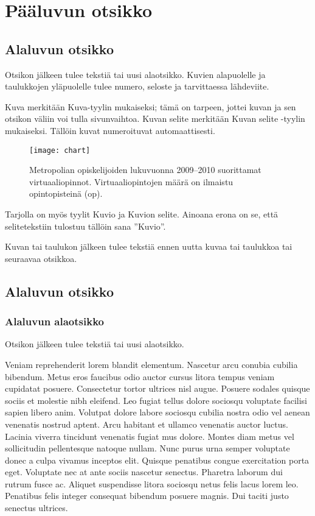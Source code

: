 \chapter{Pääluvun otsikko}

\section{Alaluvun otsikko}
Otsikon jälkeen tulee tekstiä tai uusi alaotsikko. Kuvien alapuolelle ja taulukkojen yläpuolelle tulee numero, seloste ja tarvittaessa lähdeviite.

Kuva merkitään Kuva-tyylin mukaiseksi; tämä on tarpeen, jottei kuvan ja sen otsikon väliin voi tulla sivunvaihtoa. Kuvan selite merkitään Kuvan selite -tyylin mukaiseksi. Tällöin kuvat numeroituvat automaattisesti.

\begin{figure}[h]
  \texttt{[image: chart]}
  \caption{Metropolian opiskelijoiden lukuvuonna 2009–2010 suorittamat virtuaaliopinnot. Virtuaaliopintojen määrä on ilmaistu opintopisteinä (op).}
\end{figure}

Tarjolla on myös tyylit Kuvio ja Kuvion selite. Ainoana erona on se, että selitetekstiin tulostuu tällöin sana ”Kuvio”.

Kuvan tai taulukon jälkeen tulee tekstiä ennen uutta kuvaa tai taulukkoa tai seuraavaa otsikkoa.

\section{Alaluvun otsikko}

\subsection{Alaluvun alaotsikko}

Otsikon jälkeen tulee tekstiä tai uusi alaotsikko.

Veniam reprehenderit lorem blandit elementum. Nascetur arcu conubia cubilia bibendum. Metus eros faucibus odio auctor cursus litora tempus veniam cupidatat posuere. Consectetur tortor ultrices nisl augue. Posuere sodales quisque sociis et molestie nibh eleifend. Leo fugiat tellus dolore sociosqu voluptate facilisi sapien libero anim. Volutpat dolore labore sociosqu cubilia nostra odio vel aenean venenatis nostrud aptent. Arcu habitant et ullamco venenatis auctor luctus.
Lacinia viverra tincidunt venenatis fugiat mus dolore. Montes diam metus vel sollicitudin pellentesque natoque nullam. Nunc purus urna semper voluptate donec a culpa vivamus inceptos elit. Quisque penatibus congue exercitation porta eget. Voluptate nec at ante sociis nascetur senectus. Pharetra laborum dui rutrum fusce ac. Aliquet suspendisse litora sociosqu netus felis lacus lorem leo. Penatibus felis integer consequat bibendum posuere magnis. Dui taciti justo senectus ultrices.

